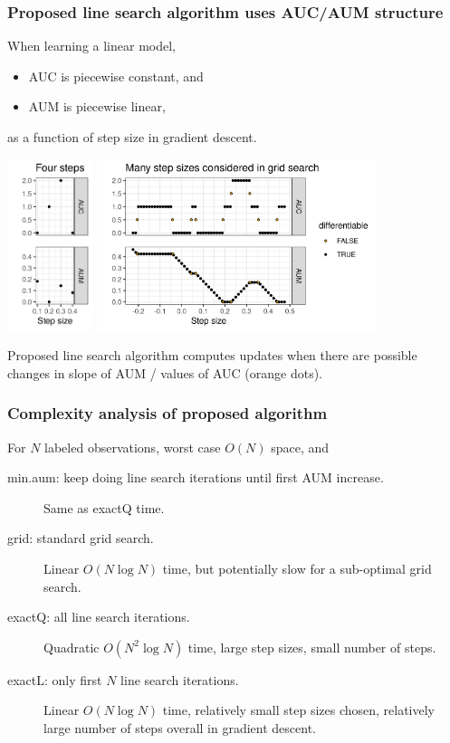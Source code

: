 \documentclass[t]{beamer}
\begin{document}
\begin{frame}
  \frametitle{Proposed line search algorithm uses AUC/AUM structure}

  When learning a linear model, 
  \begin{itemize}
  \item AUC is piecewise constant, and
  \item AUM is piecewise linear,
  \end{itemize}
  as a function of step size in gradient descent.
  
\includegraphics[height=5cm]{figure-line-search-example-some}
\includegraphics[height=5cm]{figure-line-search-example-grid}
 
Proposed line search algorithm computes updates when there are
possible changes in slope of AUM / values of AUC (orange dots).

\end{frame}



\begin{frame}
  \frametitle{Complexity analysis of proposed algorithm}
  For $N$ labeled observations, worst case $O(N)$ space, and
  \begin{description}
  \item[min.aum: keep doing line search iterations until first AUM
    increase.] Same as exactQ time.
  \item[grid: standard grid search.] Linear $O(N\log N)$ time, but
    potentially slow for a sub-optimal grid search.
  \item[exactQ: all line search iterations.] Quadratic $O(N^2\log N)$
    time, large step sizes, small number of steps.
  \item[exactL: only first $N$ line search iterations.] Linear $O(N\log N)$ time,
    relatively small step sizes chosen, relatively large number of
    steps overall in gradient descent.
  \end{description}
\end{frame}
\end{document}
